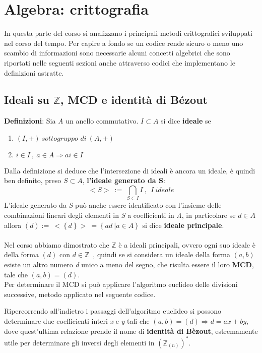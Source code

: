 \documentclass{article}
\begin{document}
	\newpage
	\section{Algebra: crittografia}
	In questa parte del corso si analizzano i principali metodi crittografici sviluppati nel corso del tempo. Per capire a fondo se un codice rende sicuro o meno uno scambio di informazioni sono necessarie alcuni concetti algebrici che sono riportati nelle seguenti sezioni anche attraverso codici che implementano le definizioni astratte.
	\subsection{Ideali su \(\mathbb{Z}\), MCD e identità di Bézout}
	\textbf{Definizioni}: Sia \textit{A} un anello commutativo. \(I\subset A\) si dice \textbf{ideale} se\\ \begin{enumerate}
		\item \((I,+)\ \textit{sottogruppo di}\ (A,+)\)
		\item \(i\in I\ ,\ a\in A\Rightarrow ai\in I \)
	\end{enumerate}
	Dalla definizione si deduce che l'intersezione di ideali è ancora un ideale, è quindi ben definito, preso \(S\subset A\), \textbf{l'ideale generato da S}:
	\[<S>\ :=\ \bigcap_{S\subset I} I\ ,\ \ I\ ideale\]
	L'ideale generato da \textit{S} può anche essere identificato con l'insieme delle combinazioni lineari degli elementi in \textit{S} a coefficienti in \textit{A}, in particolare se \(d\in A\) allora \((d):= \ <\left\{d\right\}>\ =\left\{ad \ |a\in A\right\}\) si dice \textbf{ideale principale}.\\ \\
	Nel corso abbiamo dimostrato che \(\mathbb{Z}\) è a ideali principali, ovvero ogni suo ideale è della forma \((d)\) con \(d\in\mathbb{Z}\)\ , quindi se si considera un ideale della forma \((a,b)\) esiste un altro numero \textit{d} unico a meno del segno, che risulta essere il loro \textbf{MCD}, tale che \((a,b)=(d)\).\\ Per determinare il MCD si può applicare l'algoritmo euclideo delle divisioni successive, metodo applicato nel seguente codice.
	\vspace{1cm}
	
	\vspace{1cm}
	Ripercorrendo all'indietro i passaggi dell'algoritmo euclideo si possono determinare due coefficienti interi \textit{x} e \textit{y} tali che \((a,b)=(d)\Rightarrow d=ax+by\), dove quest'ultima relazione prende il nome di \textbf{identità di Bèzout}, estremamente utile per determinare gli inversi degli elementi in \((\mathbb{Z}_{(n)})^*\). 
	\vspace{1cm}
	
	\vspace{1cm}
	
\end{document}

